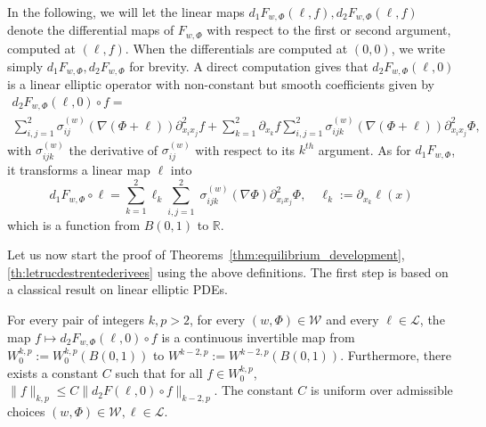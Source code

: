 \documentclass[AHL,Unicode,longabstracts,published]{cedram}
\newcommand{\R}{\mathbb{R}}
\newcommand{\clL}{\mathcal{L}}
\newcommand{\clW}{\mathcal{W}}
\newcommand{\norm}[1]{\lVert #1 \rVert}
\begin{document}
In the following, we will let the linear maps $d_1 F_{w,\Phi}(\ell,f),d_2F_{w,\Phi}(\ell,f)$ denote the differential maps of $F_{w,\Phi}$ with respect to the first or second argument, computed at $(\ell,f)$. When the differentials are computed at $(0,0)$, we write simply $d_1F_{w,\Phi}, d_2 F_{w,\Phi}$ for brevity. A direct computation gives that $d_2 F_{w,\Phi}(\ell,0)$ is a linear elliptic operator with non-constant but smooth coefficients given by
\begin{multline}\label{eq:d2F}
d_2 F_{w,\Phi}(\ell,0)\circ f=\\
\sum_{i,j=1}^2\sigma^{(w)}_{ij}(\nabla(\Phi+\ell))\partial^2_{x_i x_j}f+\sum_{k=1}^2\partial_{x_k}f\sum_{i,j=1}^2\sigma^{(w)}_{ijk}(\nabla(\Phi+\ell))\partial^2_{x_i x_j}\Phi,
\end{multline}
with $\sigma^{(w)}_{ijk}$ the derivative of $\sigma^{(w)}_{ij}$ with respect to its $k^{th}$ argument. As for $d_1 F_{w,\Phi}$, it transforms a linear map $\ell$ into
\begin{equation}\label{eq:d1F}
d_1 F_{w,\Phi}\circ \ell=\sum_{k=1}^2\ell_k\sum_{i,j=1}^2\;\sigma^{(w)}_{ijk}(\nabla\Phi)\partial^2_{x_i x_j}\Phi, \quad \ell_k:=\partial_{x_k}\ell(x)
\end{equation}
which is a function from $B(0,1)$ to $\R$.


Let us now start the proof of
Theorems~\ref{thm:equilibrium_development}, \ref{th:letrucdestrentederivees} using the above definitions. The first step is based on a classical result on linear elliptic PDEs.

\begin{prop}\label{claim:inversibilite}
For every pair of integers $k,p>2$, for every
$(w, \Phi)\in\clW$ and every $\ell \in \clL$, the map $f\mapsto d_2 F_{w,\Phi}(\ell,0)\circ f$ is a continuous invertible map from $W^{k, p}_0:=W^{k, p}_0(B(0,1))$ to $W^{k-2, p}:=W^{k-2, p}(B(0,1))$. Furthermore, there exists a constant $C$ such that for all $f \in W^{k, p}_0$, $ \norm{ f}_{{k, p}} \leq C \norm{d_2 F(\ell,0)\circ f}_{{k-2, p}}$. The constant $C$ is uniform over admissible choices $(w, \Phi)\in \clW, \ell\in\clL$.
\end{prop}
\end{document}
